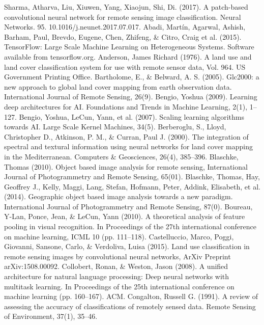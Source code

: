 \documentclass[letterpaper, 10 pt, conference]{ieeeconf}  %
\begin{document}
\begin{thebibliography}{99}

Sharma, Atharva, Liu, Xiuwen, Yang, Xiaojun, Shi, Di. (2017). A patch-based convolutional neural network for remote sensing image classification. Neural Networks. 95. 10.1016/j.neunet.2017.07.017. 
Abadi, Martín, Agarwal, Ashish, Barham, Paul, Brevdo, Eugene, Chen, Zhifeng, \& Citro, Craig et al. (2015). TensorFlow: Large Scale Machine Learning on Heterogeneous Systems. Software available from tensorflow.org.
Anderson, James Richard (1976). A land use and land cover classification system for use with remote sensor data, Vol. 964. US Government Printing Office.
Bartholome, E., \& Belward, A. S. (2005). Glc2000: a new approach to global land cover mapping from earth observation data. International Journal of Remote Sensing, 26(9).
Bengio, Yoshua (2009). Learning deep architectures for AI. Foundations and Trends in Machine Learning, 2(1), 1–127.
Bengio, Yoshua, LeCun, Yann, et al. (2007). Scaling learning algorithms towards AI. Large Scale Kernel Machines, 34(5).
Berberoglu, S., Lloyd, Christopher D., Atkinson, P. M., \& Curran, Paul J. (2000). The integration of spectral and textural information using neural networks for land cover mapping in the Mediterranean. Computers \& Geosciences, 26(4), 385–396.
Blaschke, Thomas (2010). Object based image analysis for remote sensing, International Journal of Photogrammetry and Remote Sensing, 65(01).
Blaschke, Thomas, Hay, Geoffrey J., Kelly, Maggi, Lang, Stefan, Hofmann, Peter, Addink, Elisabeth, et al. (2014). Geographic object based image analysis towards a new paradigm. International Journal of Photogrammetry and Remote Sensing, 87(0).
Boureau, Y-Lan, Ponce, Jean, \& LeCun, Yann (2010). A theoretical analysis of feature pooling in visual recognition. In Proceedings of the 27th international conference on machine learning, ICML 10 (pp. 111–118).
Castelluccio, Marco, Poggi, Giovanni, Sansone, Carlo, \& Verdoliva, Luisa (2015). Land use classification in remote sensing images by convolutional neural networks, ArXiv Preprint arXiv:1508.00092.
Collobert, Ronan, \& Weston, Jason (2008). A unified architecture for natural language processing: Deep neural networks with multitask learning. In Proceedings of the 25th international conference on machine learning (pp. 160–167). ACM.
Congalton, Russell G. (1991). A review of assessing the accuracy of classifications of remotely sensed data. Remote Sensing of Environment, 37(1), 35–46.

\end{thebibliography}
\end{document}
